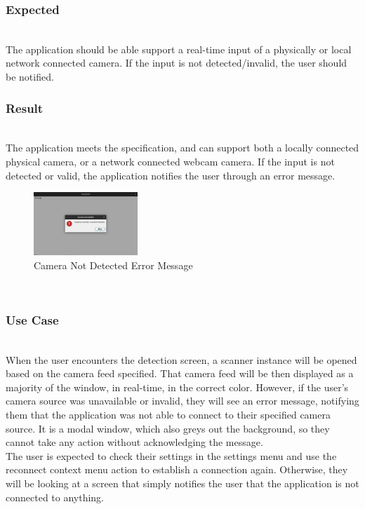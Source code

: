 \documentclass[conference]{IEEEtran}
\begin{document}
\subsubsection{Expected}~\\
The application should be able support a real-time input of a physically or local network connected camera. If the input is not detected/invalid, the user should be notified.~\\

\subsubsection{Result}~\\
The application meets the specification, and can support both a locally connected physical camera, or a network connected webcam camera. If the input is not detected or valid, the application notifies the user through an error message.

\begin{figure}[!h]
    \centering
    \includegraphics[width=0.35\textwidth]{images/camera_source_error.eps}
    \caption{Camera Not Detected Error Message}
\end{figure}~\\

\subsubsection{Use Case}~\\
When the user encounters the detection screen, a scanner instance will be opened based on the camera feed specified. That camera feed will be then displayed as a majority of the window, in real-time, in the correct color. However, if the user's camera source was unavailable or invalid, they will see an error message, notifying them that the application was not able to connect to their specified camera source. It is a modal window, which also greys out the background, so they cannot take any action without acknowledging the message. \\

The user is expected to check their settings in the settings menu and use the reconnect context menu action to establish a connection again. Otherwise, they will be looking at a screen that simply notifies the user that the application is not connected to anything.~\\
\end{document}
